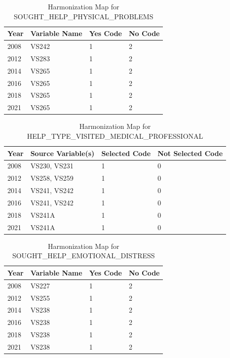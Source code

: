 \begin{table}[ht]
\centering
\caption{Harmonization Map for SOUGHT\_HELP\_PHYSICAL\_PROBLEMS}
\label{tab:map_phys_problems}
\begin{tabular}{llll}
\toprule
\textbf{Year} & \textbf{Variable Name} & \textbf{Yes Code} & \textbf{No Code} \\
\midrule
2008 & VS242 & 1  & 2  \\
2012 & VS283 & 1  & 2  \\
2014 & VS265 & 1  & 2  \\
2016 & VS265 & 1  & 2  \\
2018 & VS265 & 1  & 2  \\
2021 & VS265 & 1  & 2  \\
\bottomrule
\end{tabular}
\end{table}


\begin{table}[ht]
\centering
\caption{Harmonization Map for HELP\_TYPE\_VISITED\_MEDICAL\_PROFESSIONAL}
\label{tab:map_med_prof_revised}
\begin{tabular}{llll}
\toprule
\textbf{Year} & \textbf{Source Variable(s)} & \textbf{Selected Code} & \textbf{Not Selected Code} \\
\midrule
2008 & VS230, VS231 & 1 & 0 \\
2012 & VS258, VS259 & 1 & 0 \\
2014 & VS241, VS242 & 1 & 0 \\
2016 & VS241, VS242 & 1 & 0 \\
2018 & VS241A & 1 & 0 \\
2021 & VS241A & 1 & 0 \\
\bottomrule
\end{tabular}
\end{table}

\begin{table}[ht]
\centering
\caption{Harmonization Map for SOUGHT\_HELP\_EMOTIONAL\_DISTRESS}
\label{tab:map_emo_distress_revised}
\begin{tabular}{llll}
\toprule
\textbf{Year} & \textbf{Variable Name} & \textbf{Yes Code} & \textbf{No Code} \\
\midrule
2008 & VS227 & 1 & 2 \\
2012 & VS255 & 1 & 2 \\
2014 & VS238 & 1 & 2 \\
2016 & VS238 & 1 & 2 \\
2018 & VS238 & 1 & 2 \\
2021 & VS238 & 1 & 2 \\
\bottomrule
\end{tabular}
\end{table}